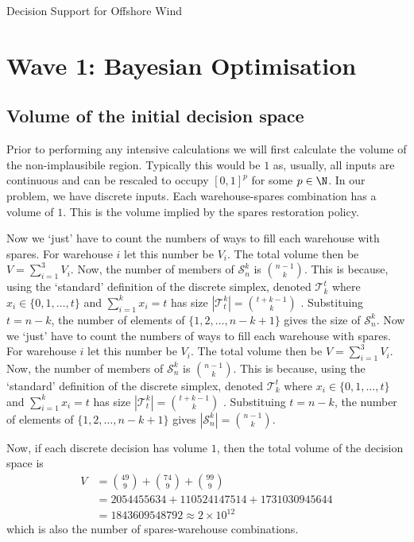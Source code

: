 \begin{chapter}{Decision Support for Offshore Wind \label{Ch:ds-for-ow}}
\section{Wave 1: Bayesian Optimisation}
\subsection{Volume of the initial decision space}
Prior to performing any intensive calculations we will first calculate the volume of the non-implausibile region. Typically this would be $1$ as, usually, all inputs are continuous and can be rescaled to occupy $[0,1]^p$ for some $p \in \N$. In our problem, we have discrete inputs. Each warehouse-spares combination has a volume of $1$. This is the volume implied by the spares restoration policy.

Now we `just' have to count the numbers of ways to fill each warehouse with spares. For warehouse $i$ let this number be $V_i$. The total volume then be $V  = \sum_{i=1}^3V_i$. Now, the number of members of $\mathcal{S}^k_n$ is ${n-1 \choose k}$. This is because, using the `standard' definition of the discrete simplex, denoted $\mathcal{T}^t_k$ where $x_i \in \{0, 1, \ldots, t\}$ and $\sum_{i=1}^k x_i = t$ has size $|\mathcal{T}^k_t| = {t+k-1 \choose k}$ \citep{}. Substituing $t = n-k$, the number of elements of $\{1, 2, \ldots, n-k+1\}$ gives the size of $\mathcal{S}^k_n$.
Now we `just' have to count the numbers of ways to fill each warehouse with spares. For warehouse $i$ let this number be $V_i$. The total volume then be $V  = \sum_{i=1}^3V_i$. Now, the number of members of $\mathcal{S}^k_n$ is ${n-1 \choose k}$. This is because, using the `standard' definition of the discrete simplex, denoted $\mathcal{T}^t_k$ where $x_i \in \{0, 1, \ldots, t\}$ and $\sum_{i=1}^k x_i = t$ has size $|\mathcal{T}^k_t| = {t+k-1 \choose k}$ \citep{Costello1971}. Substituing $t = n-k$, the number of elements of $\{1, 2, \ldots, n-k+1\}$ gives $|\mathcal{S}^k_n| = {n-1 \choose k}$.

Now, if each discrete decision has volume $1$, then the total volume of the decision space is
\begin{align*}
  V  &= {49 \choose 9} + {74 \choose 9} + {99 \choose 9}\\
  &=  2054455634 + 110524147514 + 1731030945644\\
  &= 1843609548792 \approx 2 \times 10^{12}
\end{align*}
which is also the number of spares-warehouse combinations.


\end{chapter}
